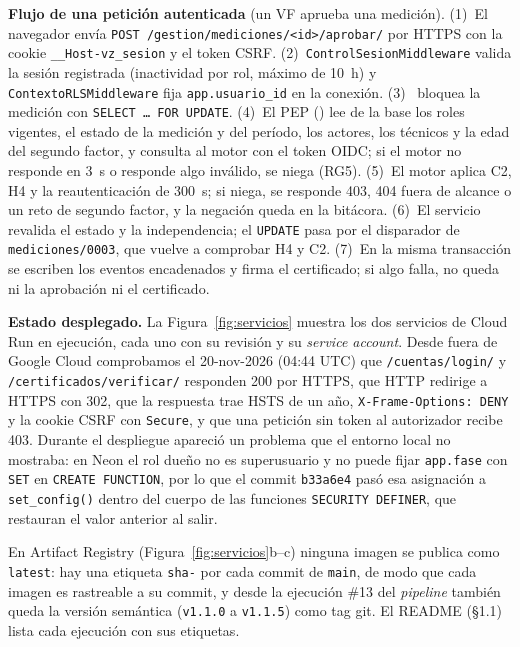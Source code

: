 \documentclass[10pt,letterpaper]{article}
\newcommand{\cod}[1]{\texttt{#1}}
\begin{document}
\textbf{Flujo de una petición autenticada} (un VF aprueba una medición). (1)~El navegador envía \cod{POST /gestion/mediciones/<id>/aprobar/} por HTTPS con la cookie \cod{\_\_Host-vz\_sesion} y el token CSRF. (2)~\cod{ControlSesionMiddleware} valida la sesión registrada (inactividad por rol, máximo de 10~h) y \cod{ContextoRLSMiddleware} fija \cod{app.usuario\_id} en la conexión. (3)~ bloquea la medición con \cod{SELECT \ldots{} FOR UPDATE}. (4)~El PEP () lee de la base los roles vigentes, el estado de la medición y del período, los actores, los técnicos y la edad del segundo factor, y  consulta al motor con el token OIDC; si el motor no responde en 3~s o responde algo inválido, se niega (RG5). (5)~El motor aplica C2, H4 y la reautenticación de 300~s; si niega, se responde 403, 404 fuera de alcance o un reto de segundo factor, y la negación queda en la bitácora. (6)~El servicio revalida el estado y la independencia; el \cod{UPDATE} pasa por el disparador de \cod{mediciones/0003}, que vuelve a comprobar H4 y C2. (7)~En la misma transacción se escriben los eventos encadenados y  firma el certificado; si algo falla, no queda ni la aprobación ni el certificado.

\textbf{Estado desplegado.} La Figura~\ref{fig:servicios} muestra los dos servicios de Cloud Run en ejecución, cada uno con su revisión y su \emph{service account}. Desde fuera de Google Cloud comprobamos el 20-nov-2026 (04:44 UTC) que \cod{/cuentas/login/} y \cod{/certificados/verificar/} responden 200 por HTTPS, que HTTP redirige a HTTPS con 302, que la respuesta trae HSTS de un año, \cod{X-Frame-Options: DENY} y la cookie CSRF con \cod{Secure}, y que una petición sin token al autorizador recibe 403. Durante el despliegue apareció un problema que el entorno local no mostraba: en Neon el rol dueño no es superusuario y no puede fijar \cod{app.fase} con \cod{SET} en \cod{CREATE FUNCTION}, por lo que el commit \cod{b33a6e4} pasó esa asignación a \cod{set\_config()} dentro del cuerpo de las funciones \cod{SECURITY DEFINER}, que restauran el valor anterior al salir.

En Artifact Registry (Figura~\ref{fig:servicios}b--c) ninguna imagen se publica como \cod{latest}: hay una etiqueta \cod{sha-} por cada commit de \cod{main}, de modo que cada imagen es rastreable a su commit, y desde la ejecución \#13 del \emph{pipeline} también queda la versión semántica (\cod{v1.1.0} a \cod{v1.1.5}) como tag git. El README (§1.1) lista cada ejecución con sus etiquetas.
\end{document}
